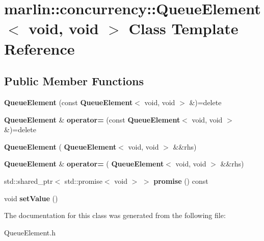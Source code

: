 \section{marlin\+:\+:concurrency\+:\+:Queue\+Element$<$ void, void $>$ Class Template Reference}
\label{classmarlin_1_1concurrency_1_1QueueElement_3_01void_00_01void_01_4}
\subsection*{Public Member Functions}
\begin{DoxyCompactItemize}
\item 
\mbox{\label{classmarlin_1_1concurrency_1_1QueueElement_3_01void_00_01void_01_4_a7963e94cd147b135f16af4d5f624096f}} 
{\bfseries Queue\+Element} (const \textbf{ Queue\+Element}$<$ void, void $>$ \&)=delete
\item 
\mbox{\label{classmarlin_1_1concurrency_1_1QueueElement_3_01void_00_01void_01_4_afbeb47bfd74d5d55e93de053729c56cd}} 
\textbf{ Queue\+Element} \& {\bfseries operator=} (const \textbf{ Queue\+Element}$<$ void, void $>$ \&)=delete
\item 
\mbox{\label{classmarlin_1_1concurrency_1_1QueueElement_3_01void_00_01void_01_4_a056f749849a2f82e77d8913e44711557}} 
{\bfseries Queue\+Element} (\textbf{ Queue\+Element}$<$ void, void $>$ \&\&rhs)
\item 
\mbox{\label{classmarlin_1_1concurrency_1_1QueueElement_3_01void_00_01void_01_4_aef94dac7ba236b1a8cd3e678255893d8}} 
\textbf{ Queue\+Element} \& {\bfseries operator=} (\textbf{ Queue\+Element}$<$ void, void $>$ \&\&rhs)
\item 
\mbox{\label{classmarlin_1_1concurrency_1_1QueueElement_3_01void_00_01void_01_4_a3c6c05b1de010e22e7b2097835960175}} 
std\+::shared\+\_\+ptr$<$ std\+::promise$<$ void $>$ $>$ {\bfseries promise} () const
\item 
\mbox{\label{classmarlin_1_1concurrency_1_1QueueElement_3_01void_00_01void_01_4_aede68df98bf8e4761f326c02321c65c2}} 
void {\bfseries set\+Value} ()
\end{DoxyCompactItemize}


The documentation for this class was generated from the following file\+:\begin{DoxyCompactItemize}
\item 
Queue\+Element.\+h\end{DoxyCompactItemize}
